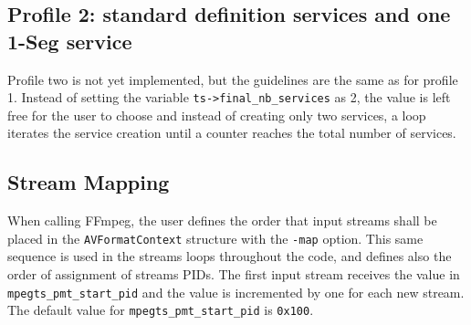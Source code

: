 \documentclass[
	12pt,				%
	openright,			%
	twoside,			%
	a4paper,			%
	brazil,
	french,				%
	english
	]{abntex2}
\begin{document}
\subsection{Profile 2: standard definition services and one 1-Seg service}

Profile two is not yet implemented, but the guidelines are the same as for profile 1. Instead of setting the variable \texttt{ts->final\hspace{0.1mm}\_\hspace{0.1mm}nb\hspace{0.1mm}\_\hspace{0.1mm}services} as 2, the value is left free for the user to choose and instead of creating only two services, a loop iterates the service creation until a counter reaches the total number of services.

\subsection{Stream Mapping}
\label{stream_mapping}

When calling FFmpeg, the user defines the order that input streams shall be placed in the \texttt{AVFormatContext} structure with the \texttt{-map} option. This same sequence is used in the streams loops throughout the code, and defines also the order of assignment of streams PIDs. The first input stream receives the value in \texttt{mpegts\hspace{0.1mm}\_\hspace{0.1mm}pmt\hspace{0.1mm}\_\hspace{0.1mm}start\hspace{0.1mm}\_\hspace{0.1mm}pid} and the value is incremented by one for each new stream. The default value for \texttt{mpegts\hspace{0.1mm}\_\hspace{0.1mm}pmt\hspace{0.1mm}\_\hspace{0.1mm}start\hspace{0.1mm}\_\hspace{0.1mm}pid} is \texttt{0x100}.
\end{document}
